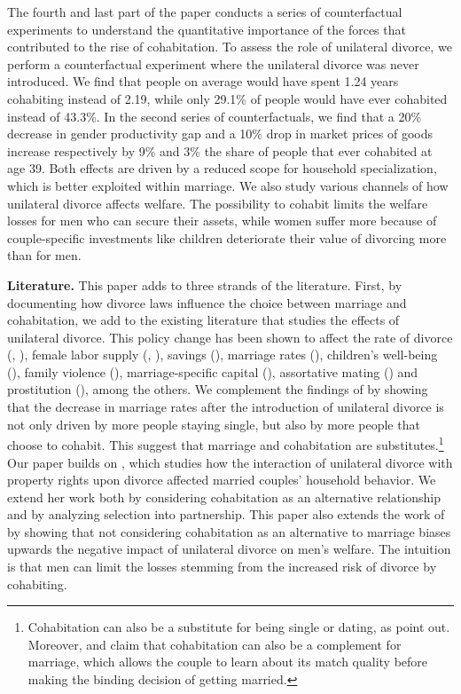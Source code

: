 \documentclass[12pt]{article}
\numberwithin{table}{section}
\begin{document}
The fourth and last part of the paper conducts a series of counterfactual experiments to understand the quantitative importance of the forces that contributed to the rise of cohabitation. To assess the role of unilateral divorce, we perform a counterfactual experiment where the unilateral divorce was never introduced. We find that people on average would have spent 1.24 years cohabiting instead of 2.19, while only 29.1\% of people would have ever cohabited instead of 43.3\%. In the second series of counterfactuals, we find that a 20\% decrease in gender productivity gap and a 10\% drop in market prices of goods increase respectively by 9\% and 3\% the share of people that ever cohabited at age 39. Both effects are driven by a reduced scope for household specialization, which is better exploited within marriage. We also study various channels of how unilateral divorce affects welfare. The possibility to cohabit limits the welfare losses for men who can secure their assets, while women suffer more because of couple-specific investments like children deteriorate their value of divorcing more than for men.

\textbf{Literature.} This paper adds to three strands of the literature. First, by documenting how divorce laws influence the choice between marriage and cohabitation, we add to the existing literature that studies the effects of unilateral divorce. This policy change has been shown to affect the rate of divorce (\citealp{friedberg1998}, \citealp{wolfers2006}), female labor supply (\citealp{stevenson2008}, \citealp{voena2015}), savings (\citealp{voena2015}), marriage rates (\citealp{rasul2003,rasul2006}), children's well-being (\citealp{gruber2004}), family violence (\citealp{stevenson2006}), marriage-specific capital (\citealp{stevenson2007}), assortative mating (\citealp{reynoso2019}) and prostitution (\citealp{ciacci2017}), among the others. We complement the findings of \cite{rasul2003,rasul2006} by showing that the decrease in marriage rates after the introduction of unilateral divorce is not only driven by more people staying single, but also by more people that choose to cohabit. This suggest that marriage and cohabitation are substitutes.\footnote{Cohabitation can also be a substitute for being single or dating, as \cite{rindfuss1990} point out. Moreover, \cite{blasutto2020} and \cite{brien2006} claim that cohabitation can also be a complement for marriage, which allows the couple to learn about its match quality before making the binding decision of getting married.} Our paper builds on \cite{voena2015},  which studies how the interaction of unilateral divorce with property rights upon divorce affected married couples' household behavior. We extend her work both by considering cohabitation as an alternative relationship and by analyzing selection into partnership. This paper also extends the work of \cite{fernandez2017} by showing that not considering cohabitation as an alternative to marriage biases upwards the negative impact of unilateral divorce on men's welfare. The intuition is that men can limit the losses stemming from the increased risk of divorce by cohabiting.
\end{document}
